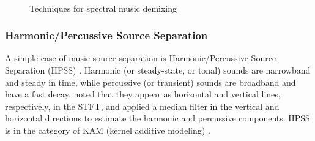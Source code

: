 \documentclass[report.tex]{subfiles}
\begin{document}
\begin{figure}[ht]
	\centering
	\\
	\caption{Techniques for spectral music demixing \parencite[36, 38]{musicsepgood}}
	\label{fig:spectraldemix}
\end{figure}

\subsubsection{Harmonic/Percussive Source Separation}
\label{sec:hpss}

A simple case of music source separation is Harmonic/Percussive Source Separation (HPSS) \parencite{musicsepgood}. Harmonic (or steady-state, or tonal) sounds are narrowband and steady in time, while percussive (or transient) sounds are broadband and have a fast decay. \textcite{fitzgerald1} noted that they appear as horizontal and vertical lines, respectively, in the STFT, and applied a median filter in the vertical and horizontal directions to estimate the harmonic and percussive components. HPSS is in the category of KAM (kernel additive modeling) \parencite{musicsepgood}.
\end{document}

